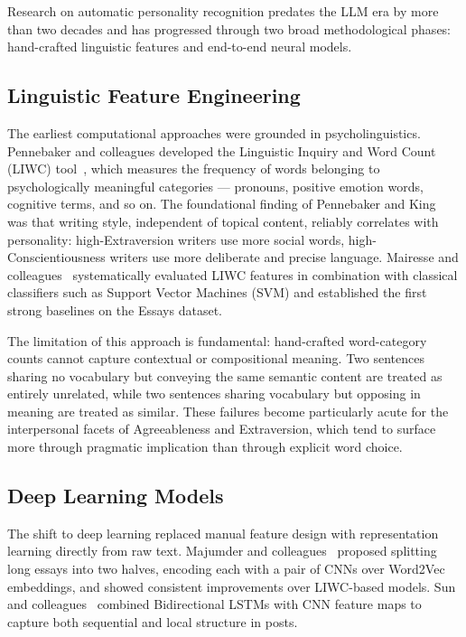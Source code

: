\documentclass[../main.tex]{subfiles}
\begin{document}
Research on automatic personality recognition predates the LLM era by more than two decades and has progressed through two broad methodological phases: hand-crafted linguistic features and end-to-end neural models.

\subsection{Linguistic Feature Engineering}

The earliest computational approaches were grounded in psycholinguistics. Pennebaker and colleagues developed the Linguistic Inquiry and Word Count (LIWC) tool~\cite{pennebaker2001linguistic}, which measures the frequency of words belonging to psychologically meaningful categories --- pronouns, positive emotion words, cognitive terms, and so on. The foundational finding of Pennebaker and King~\cite{pennebaker1999linguistic} was that writing style, independent of topical content, reliably correlates with personality: high-Extraversion writers use more social words, high-Conscientiousness writers use more deliberate and precise language. Mairesse and colleagues~\cite{mairesse2007using} systematically evaluated LIWC features in combination with classical classifiers such as Support Vector Machines (SVM) and established the first strong baselines on the Essays dataset.

The limitation of this approach is fundamental: hand-crafted word-category counts cannot capture contextual or compositional meaning. Two sentences sharing no vocabulary but conveying the same semantic content are treated as entirely unrelated, while two sentences sharing vocabulary but opposing in meaning are treated as similar. These failures become particularly acute for the interpersonal facets of Agreeableness and Extraversion, which tend to surface more through pragmatic implication than through explicit word choice.

\subsection{Deep Learning Models}

The shift to deep learning replaced manual feature design with representation learning directly from raw text. Majumder and colleagues~\cite{majumder2017deep} proposed splitting long essays into two halves, encoding each with a pair of CNNs over Word2Vec embeddings, and showed consistent improvements over LIWC-based models. Sun and colleagues~\cite{sun2018personality} combined Bidirectional LSTMs with CNN feature maps to capture both sequential and local structure in posts.
\end{document}

